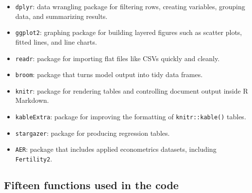\documentclass[
]{article}
\providecommand{\tightlist}{%
  \setlength{\itemsep}{0pt}\setlength{\parskip}{0pt}}
\begin{document}
\begin{itemize}
\tightlist
\item
  \texttt{dplyr}: data wrangling package for filtering rows, creating
  variables, grouping data, and summarizing results.
\item
  \texttt{ggplot2}: graphing package for building layered figures such
  as scatter plots, fitted lines, and line charts.
\item
  \texttt{readr}: package for importing flat files like CSVs quickly and
  cleanly.
\item
  \texttt{broom}: package that turns model output into tidy data frames.
\item
  \texttt{knitr}: package for rendering tables and controlling document
  output inside R Markdown.
\item
  \texttt{kableExtra}: package for improving the formatting of
  \texttt{knitr::kable()} tables.
\item
  \texttt{stargazer}: package for producing regression tables.
\item
  \texttt{AER}: package that includes applied econometrics datasets,
  including \texttt{Fertility2}.
\end{itemize}

\subsection{Fifteen functions used in the
code}\label{fifteen-functions-used-in-the-code}
\end{document}
